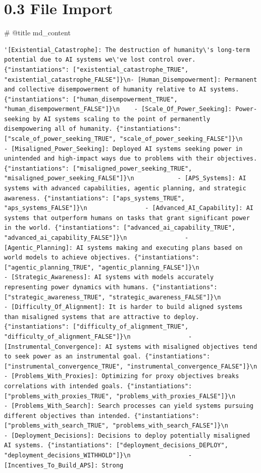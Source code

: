\documentclass[
  11pt,
  letterpaper,
]{book}
\newenvironment{Shaded}{\begin{snugshade}}{\end{snugshade}}
\newcommand{\CommentTok}[1]{\textcolor[rgb]{0.37,0.37,0.37}{#1}}
\newcommand{\NormalTok}[1]{\textcolor[rgb]{0.00,0.23,0.31}{#1}}
\begin{document}
\section{0.3 File Import}\label{file-import}

\begin{Shaded}
\begin{Highlighting}[]
\CommentTok{\# @title}
\NormalTok{md\_content}
\end{Highlighting}
\end{Shaded}

\begin{verbatim}
'[Existential_Catastrophe]: The destruction of humanity\'s long-term potential due to AI systems we\'ve lost control over. {"instantiations": ["existential_catastrophe_TRUE", "existential_catastrophe_FALSE"]}\n- [Human_Disempowerment]: Permanent and collective disempowerment of humanity relative to AI systems. {"instantiations": ["human_disempowerment_TRUE", "human_disempowerment_FALSE"]}\n    - [Scale_Of_Power_Seeking]: Power-seeking by AI systems scaling to the point of permanently disempowering all of humanity. {"instantiations": ["scale_of_power_seeking_TRUE", "scale_of_power_seeking_FALSE"]}\n        - [Misaligned_Power_Seeking]: Deployed AI systems seeking power in unintended and high-impact ways due to problems with their objectives. {"instantiations": ["misaligned_power_seeking_TRUE", "misaligned_power_seeking_FALSE"]}\n            - [APS_Systems]: AI systems with advanced capabilities, agentic planning, and strategic awareness. {"instantiations": ["aps_systems_TRUE", "aps_systems_FALSE"]}\n                - [Advanced_AI_Capability]: AI systems that outperform humans on tasks that grant significant power in the world. {"instantiations": ["advanced_ai_capability_TRUE", "advanced_ai_capability_FALSE"]}\n                - [Agentic_Planning]: AI systems making and executing plans based on world models to achieve objectives. {"instantiations": ["agentic_planning_TRUE", "agentic_planning_FALSE"]}\n                - [Strategic_Awareness]: AI systems with models accurately representing power dynamics with humans. {"instantiations": ["strategic_awareness_TRUE", "strategic_awareness_FALSE"]}\n            - [Difficulty_Of_Alignment]: It is harder to build aligned systems than misaligned systems that are attractive to deploy. {"instantiations": ["difficulty_of_alignment_TRUE", "difficulty_of_alignment_FALSE"]}\n                - [Instrumental_Convergence]: AI systems with misaligned objectives tend to seek power as an instrumental goal. {"instantiations": ["instrumental_convergence_TRUE", "instrumental_convergence_FALSE"]}\n                - [Problems_With_Proxies]: Optimizing for proxy objectives breaks correlations with intended goals. {"instantiations": ["problems_with_proxies_TRUE", "problems_with_proxies_FALSE"]}\n                - [Problems_With_Search]: Search processes can yield systems pursuing different objectives than intended. {"instantiations": ["problems_with_search_TRUE", "problems_with_search_FALSE"]}\n            - [Deployment_Decisions]: Decisions to deploy potentially misaligned AI systems. {"instantiations": ["deployment_decisions_DEPLOY", "deployment_decisions_WITHHOLD"]}\n                - [Incentives_To_Build_APS]: Strong 
\end{verbatim}
\end{document}
